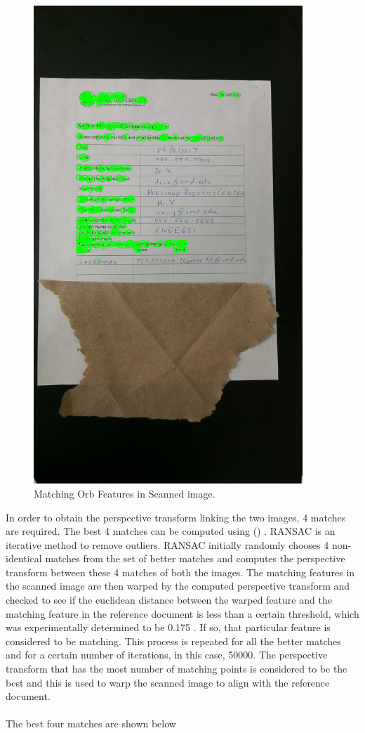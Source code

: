 \pagebreak
\begin{figure}[th]
	\centering
	\includegraphics[height=18cm ]{Figures/orb_scanned_image}
	\caption[Matching Orb Features in Scanned Image]{Matching Orb Features in Scanned image.}
	\label{fig:ScannedImageORBFeatures}
\end{figure}

\pagebreak

 In order to obtain the perspective transform linking the two images, 4 matches are required. The best 4 matches can be computed using  (\cite{Reference11}) . RANSAC is an iterative method to remove outliers. RANSAC initially randomly chooses 4 non-identical matches from the set of better matches and computes the perspective transform between these 4 matches of both the images. The matching features in the scanned image are then warped by the computed perspective transform and checked to see if the euclidean distance between the warped feature and the matching feature in the reference document is less than a certain threshold, which was experimentally determined to be 0.175 . If so, that particular feature is considered to be matching. This process is repeated for all the better matches and for a certain number of iterations, in this case, 50000. The perspective transform that has the most number of matching points is considered to be the best and this is used to warp the scanned image to align with the reference document. \\ \\
 The best four matches are shown below \\ \\ 
 
